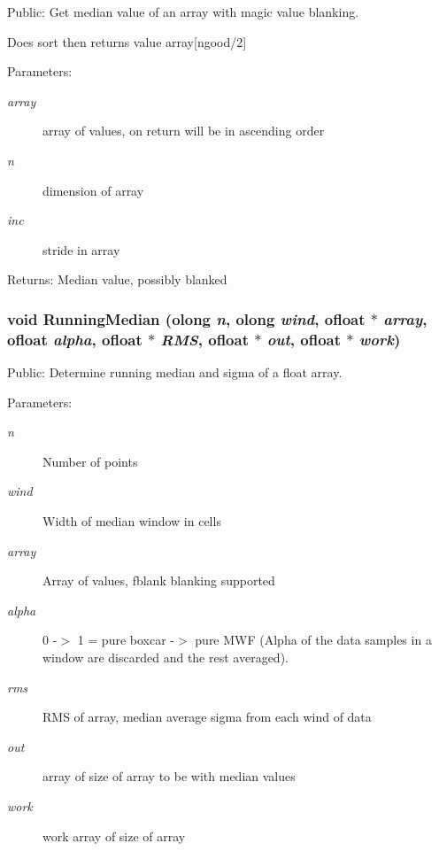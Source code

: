 Public: Get median value of an array with magic value blanking. 

Does sort then returns value array[ngood/2] \begin{Desc}
\item[Parameters:]
\begin{description}
\item[{\em array}]array of values, on return will be in ascending order \item[{\em n}]dimension of array \item[{\em inc}]stride in array \end{description}
\end{Desc}
\begin{Desc}
\item[Returns:]Median value, possibly blanked \end{Desc}
\subsubsection{\setlength{\rightskip}{0pt plus 5cm}void Running\-Median ({\bf olong} {\em n}, {\bf olong} {\em wind}, {\bf ofloat} $\ast$ {\em array}, {\bf ofloat} {\em alpha}, {\bf ofloat} $\ast$ {\em RMS}, {\bf ofloat} $\ast$ {\em out}, {\bf ofloat} $\ast$ {\em work})}\label{ObitUtil_8c_a4}


Public: Determine running median and sigma of a float array. 

\begin{Desc}
\item[Parameters:]
\begin{description}
\item[{\em n}]Number of points \item[{\em wind}]Width of median window in cells \item[{\em array}]Array of values, fblank blanking supported \item[{\em alpha}]0 -$>$ 1 = pure boxcar -$>$ pure MWF (Alpha of the data samples in a window are discarded and the rest averaged). \item[{\em rms}]RMS of array, median average sigma from each wind of data \item[{\em out}]array of size of array to be with median values \item[{\em work}]work array of size of array \end{description}
\end{Desc}
